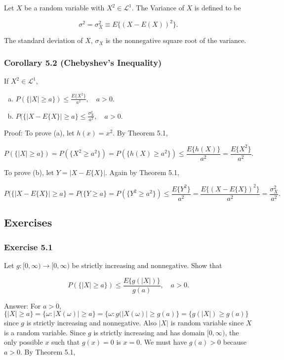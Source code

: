 \documentclass{article}
\begin{document}
{Let $X$ be a random variable with $X^2 \in \mathcal{L}^1$. The Variance of $X$ is defined to be

$$\sigma^2 = \sigma_X^2 \equiv E\{(X - E(X))^2\}.$$

The standard deviation of $X$, $\sigma_X$ is the nonnegative square root of the variance. 

\subsubsection*{Corollary 5.2 (Chebyshev's Inequality)}

If $X^2 \in \mathcal{L}^1$,

\begin{enumerate}[(a)]
\item $P(\{|X| \geq a\}) \leq \frac{E\{X^2\}}{a^2}, \quad a >0$.

\item $P(\{|X - E\{X\}| \geq a\} \leq \frac{\sigma_X^2}{a^2}, \quad a > 0$.
\end{enumerate}

Proof: To prove (a), let $h(x) = x^2$. By Theorem 5.1,

$$
P(\{|X| \geq a\}) = P(\{X^2 \geq a^2\}) = P(\{h(X) \geq a^2\}) \leq \frac{E\{h(X)\}}{a^2} = \frac{E\{X^2\}}{a^2}.
$$

To prove (b), let $Y = |X - E\{X\}|$. Again by Theorem 5.1,

$$
P(\{|X - E\{X\}| \geq a\} = P(\{Y \geq a\} = P(\{Y^2 \geq a^2\}) \leq \frac{E\{Y^2\}}{a^2} = \frac{E\{(X - E\{X\})^2\}}{a^2} = \frac{\sigma_X^2}{a^2}.
$$

\subsection*{Exercises}

\subsubsection*{Exercise 5.1}

Let $g : [0, \infty) \rightarrow [0,\infty)$ be strictly increasing and nonnegative. Show that

$$
P(\{|X| \geq a\}) \leq
\frac{E\{g(|X|)\}}
{g(a)}, \quad a > 0.
$$

Answer: For $a > 0$, $\{|X| \geq a \} = \{\omega : |X(\omega)| \geq a\} = \{\omega : g(|X(\omega)| \geq g(a)\} = \{g(|X|) \geq g(a)\}$ since $g$ is strictly increasing and nonnegative. Also $|X|$ is random variable since $X$ is a random variable. Since $g$ is strictly increasing and has domain $[0,\infty)$, the only possible $x$ such that $g(x) = 0$ is $x = 0$. We must have $g(a) > 0$ because $a > 0$. By Theorem 5.1,

}
\end{document}
